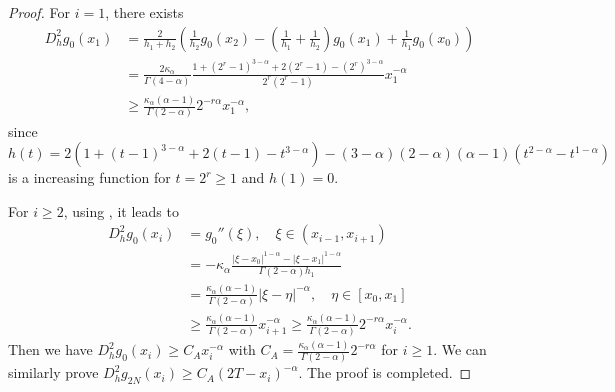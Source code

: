 \documentclass{amsart}
\theoremstyle{definition}
\theoremstyle{remark}
\numberwithin{equation}{section}
\begin{document}
\begin{proof}
  For \(i=1\), there exists
  \begin{equation*}
    \begin{aligned}
      D_h^2 g_0(x_1) &= \frac{2}{h_{1} + h_{2}} \left( \frac{1}{h_{2}} g_0(x_{2}) - (\frac{1}{h_{1}}+\frac{1}{h_{2}})g_0(x_{1}) + \frac{1}{h_{1}} g_0(x_{0}) \right)                                                       \\
        &= \frac{2\kappa_\alpha}{\Gamma(4-\alpha)} \frac{1+(2^r-1)^{3-\alpha} + 2(2^r-1) - (2^r)^{3-\alpha} }{2^r (2^r-1)} x_1^{-\alpha} \\
        &\ge  \frac{\kappa_\alpha(\alpha-1)}{\Gamma(2-\alpha)}2^{-r\alpha} x_1^{-\alpha} ,
    \end{aligned}
  \end{equation*}
  since
  $ h(t) = 2\left( 1+(t-1)^{3-\alpha} + 2(t-1) - t^{3-\alpha} \right) - (3-\alpha)(2-\alpha)(\alpha-1)( t^{2-\alpha} - t^{1-\alpha}) $ is a increasing function for $t=2^r\ge 1$ and $h(1)=0$.

  For \(i \ge 2\), using , it leads to
  \begin{equation*}
    \begin{aligned}
      D_h^2 g_0(x_i) &=  g_0''(\xi) , \quad \xi \in (x_{i-1}, x_{i+1}) \\
                 & =  -\kappa_\alpha \frac{|\xi-x_0|^{1-\alpha} - |\xi-x_1|^{1-\alpha}}{\Gamma(2-\alpha)h_1}                                               \\
                 & = \frac{\kappa_\alpha(\alpha-1)}{\Gamma(2-\alpha)}  |\xi-\eta|^{-\alpha} , \quad \eta\in [x_0, x_1]                                              \\
                 & \ge \frac{\kappa_\alpha(\alpha-1)}{\Gamma(2-\alpha)} x_{i+1}^{-\alpha}  
                 \ge \frac{\kappa_\alpha(\alpha-1)}{\Gamma(2-\alpha)} 2^{-r\alpha} x_{i}^{-\alpha} .
    \end{aligned}
  \end{equation*}
  Then we have
  \(
    D_h^2 g_0(x_i) \ge C_A x_i^{-\alpha}
  \) with $C_A = \frac{\kappa_\alpha (\alpha-1)}{\Gamma(2-\alpha)}2^{-r\alpha} $ for $i\ge 1$.
  We can similarly prove
  \(
    D_h^2 g_{2N}(x_i) \ge C_A (2T-x_i)^{-\alpha} 
  \). The proof is completed.
\end{proof}
\end{document}
